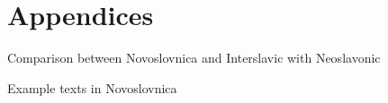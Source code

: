 \chapter{Appendices}



Comparison between Novoslovnica and Interslavic with Neoslavonic

Example texts in Novoslovnica

